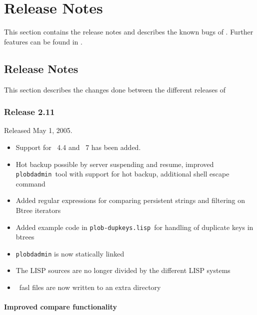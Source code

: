 
\chapter{Release Notes}

This section contains the release notes and describes the known bugs
of \plob. Further features can be found in \cite{bib:Kirschke-94a}.

\section{Release Notes}%
\label{sec:ReleaseNotes}

This section describes the changes done between the different releases
of \plob

\subsection{Release 2.11}

Released May 1, 2005.

\begin{itemize}
  
\item Support for  \lwcl\ 4.4 and \allegrocl\ 7 has been
  added.

\item Hot backup possible by server suspending and resume, improved
  \texttt{plobdadmin}\ tool with support for hot backup, additional
  shell escape command

\item Added regular expressions for comparing persistent strings and
  filtering on Btree iterators

\item Added example code in \texttt{plob-dupkeys.lisp}\ for handling
  of duplicate keys in btrees

\item \texttt{plobdadmin} is now statically linked

\item The LISP sources are no longer divided by the different LISP
  systems

\item \lwcl\ fasl files are now written to an extra directory

\end{itemize}

\subsubsection{Improved compare functionality}

